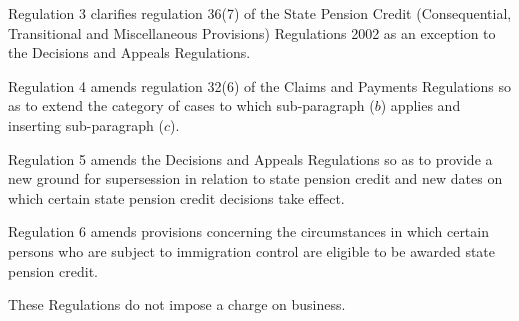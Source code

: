 \documentclass[12pt,a4paper]{article}
\begin{document}
Regulation 3 clarifies regulation 36(7) of the State Pension Credit (Consequential, Transitional and Miscellaneous Provisions) Regulations 2002 as an exception to the Decisions and Appeals Regulations.

Regulation 4 amends regulation 32(6) of the Claims and Payments Regulations so as to extend the category of cases to which sub-paragraph ($b$)  applies and inserting sub-paragraph ($c$).

Regulation 5 amends the Decisions and Appeals Regulations so as to provide a new ground for supersession in relation to state pension credit and new dates on which certain state pension credit decisions take effect.

Regulation 6 amends provisions concerning the circumstances in which certain persons who are subject to immigration control are eligible to be awarded state pension credit.

These Regulations do not impose a charge on business. 
\end{document}
